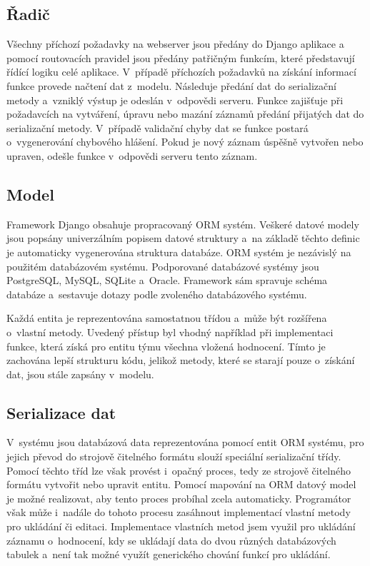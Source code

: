 \documentclass[
  digital,
  twoside,
  table, 
  nolof, 
  nolot
]{fithesis3}
\begin{document}
\subsection{Řadič}
\label{radic}
Všechny příchozí požadavky na webserver jsou předány do Django aplikace a pomocí routovacích pravidel jsou předány patřičným funkcím, které představují řídící logiku celé aplikace. V~případě příchozích požadavků na získání informací funkce provede načtení dat z~modelu. Následuje předání dat do serializační metody a~vzniklý výstup je odeslán v~odpovědi serveru. Funkce zajišťuje při požadavcích na vytváření, úpravu nebo mazání záznamů předání přijatých dat do serializační metody. V~případě validační chyby dat se funkce postará o~vygenerování chybového hlášení. Pokud je nový záznam úspěšně vytvořen nebo upraven, odešle funkce v~odpovědi serveru tento záznam.

\subsection{Model}
\label{model}
Framework Django obsahuje propracovaný ORM systém. Veškeré datové modely jsou popsány univerzálním popisem datové struktury a~na základě těchto definic je automaticky vygenerována struktura databáze. ORM systém je nezávislý na použitém databázovém systému. Podporované databázové systémy jsou PostgreSQL, MySQL, SQLite a~Oracle. Framework sám spravuje schéma databáze a~sestavuje dotazy podle zvoleného databázového systému.

Každá entita je reprezentována samostatnou třídou a~může být rozšířena o~vlastní metody. Uvedený přístup byl vhodný například při implementaci funkce, která získá pro entitu týmu všechna vložená hodnocení. Tímto je zachována lepší strukturu kódu, jelikož metody, které se starají pouze o~získání dat, jsou stále zapsány v~modelu.

\subsection{Serializace dat}
\label{serializer}
V~systému jsou databázová data reprezentována pomocí entit ORM systému, pro jejich převod do strojově čitelného formátu slouží speciální serializační třídy. Pomocí těchto tříd lze však provést i~opačný proces, tedy ze strojově čitelného formátu vytvořit nebo upravit entitu. Pomocí mapování na ORM datový model je možné realizovat, aby tento proces probíhal zcela automaticky. Programátor však může i~nadále do tohoto procesu zasáhnout implementací vlastní metody pro ukládání či editaci. Implementace vlastních metod jsem využil pro ukládání záznamu o~hodnocení, kdy se ukládají data do dvou různých databázových tabulek a~není tak možné využít generického chování funkcí pro ukládání.
\end{document}
